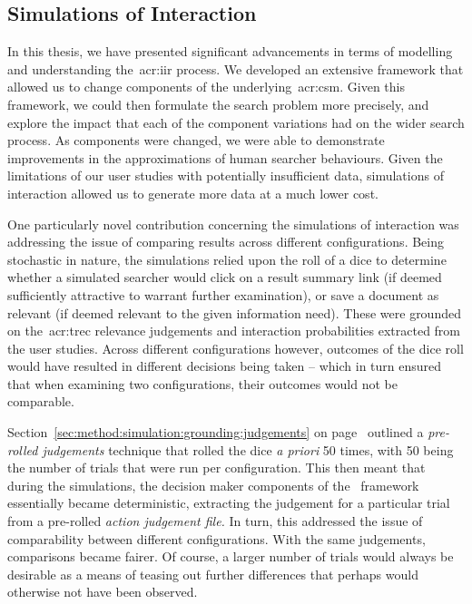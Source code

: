 \subsection{Simulations of Interaction}\label{sec:conclusions:discussion:simulations}
In this thesis, we have presented significant advancements in terms of modelling and understanding the~\gls{acr:iir} process. We developed an extensive framework that allowed us to change components of the underlying~\gls{acr:csm}. Given this framework, we could then formulate the search problem more precisely, and explore the impact that each of the component variations had on the wider search process. As components were changed, we were able to demonstrate improvements in the approximations of human searcher behaviours. Given the limitations of our user studies with potentially insufficient data, simulations of interaction allowed us to generate more data at a much lower cost.

One particularly novel contribution concerning the simulations of interaction was addressing the issue of comparing results across different configurations. Being stochastic in nature, the simulations relied upon the roll of a dice to determine whether a simulated searcher would click on a result summary link (if deemed sufficiently attractive to warrant further examination), or save a document as relevant (if deemed relevant to the given information need). These were grounded on the~\gls{acr:trec} relevance judgements and interaction probabilities extracted from the user studies. Across different configurations however, outcomes of the dice roll would have resulted in different decisions being taken -- which in turn ensured that when examining two configurations, their outcomes would not be comparable.

Section~\ref{sec:method:simulation:grounding:judgements} on page~\pageref{sec:method:simulation:grounding:judgements} outlined a \emph{pre-rolled judgements} technique that rolled the dice \emph{a priori} 50 times, with 50 being the number of trials that were run per configuration. This then meant that during the simulations, the decision maker components of the \simiir~framework essentially became deterministic, extracting the judgement for a particular trial from a pre-rolled \emph{action judgement file.} In turn, this addressed the issue of comparability between different configurations. With the same judgements, comparisons became fairer. Of course, a larger number of trials would always be desirable as a means of teasing out further differences that perhaps would otherwise not have been observed.

